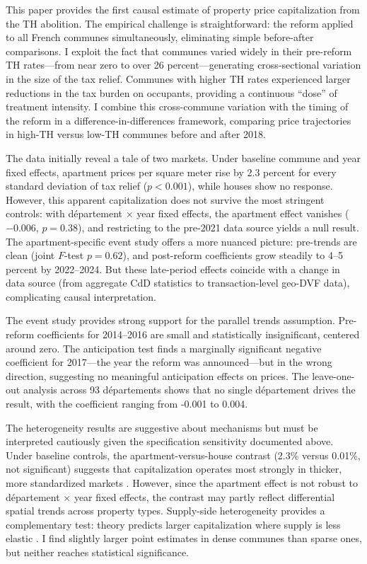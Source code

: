 \documentclass[12pt]{article}
\begin{document}
This paper provides the first causal estimate of property price capitalization from the TH abolition. The empirical challenge is straightforward: the reform applied to all French communes simultaneously, eliminating simple before-after comparisons. I exploit the fact that communes varied widely in their pre-reform TH rates---from near zero to over 26 percent---generating cross-sectional variation in the size of the tax relief. Communes with higher TH rates experienced larger reductions in the tax burden on occupants, providing a continuous ``dose'' of treatment intensity. I combine this cross-commune variation with the timing of the reform in a difference-in-differences framework, comparing price trajectories in high-TH versus low-TH communes before and after 2018.

The data initially reveal a tale of two markets. Under baseline commune and year fixed effects, apartment prices per square meter rise by 2.3 percent for every standard deviation of tax relief ($p < 0.001$), while houses show no response. However, this apparent capitalization does not survive the most stringent controls: with d\'{e}partement $\times$ year fixed effects, the apartment effect vanishes ($-0.006$, $p = 0.38$), and restricting to the pre-2021 data source yields a null result. The apartment-specific event study offers a more nuanced picture: pre-trends are clean (joint $F$-test $p = 0.62$), and post-reform coefficients grow steadily to 4--5 percent by 2022--2024. But these late-period effects coincide with a change in data source (from aggregate CdD statistics to transaction-level geo-DVF data), complicating causal interpretation.

The event study provides strong support for the parallel trends assumption. Pre-reform coefficients for 2014--2016 are small and statistically insignificant, centered around zero. The anticipation test finds a marginally significant negative coefficient for 2017---the year the reform was announced---but in the wrong direction, suggesting no meaningful anticipation effects on prices. The leave-one-out analysis across 93 d\'{e}partements shows that no single d\'{e}partement drives the result, with the coefficient ranging from -0.001 to 0.004.

The heterogeneity results are suggestive about mechanisms but must be interpreted cautiously given the specification sensitivity documented above. Under baseline controls, the apartment-versus-house contrast (2.3\% versus 0.01\%, not significant) suggests that capitalization operates most strongly in thicker, more standardized markets \citep{palmon1998property}. However, since the apartment effect is not robust to d\'{e}partement $\times$ year fixed effects, the contrast may partly reflect differential spatial trends across property types. Supply-side heterogeneity provides a complementary test: theory predicts larger capitalization where supply is less elastic \citep{lutz2015fiscal}. I find slightly larger point estimates in dense communes than sparse ones, but neither reaches statistical significance.
\end{document}
